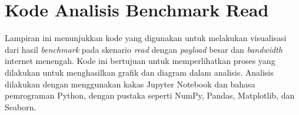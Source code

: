\chapter{Kode Analisis Benchmark Read}
\label{appendix:read-benchmark-code}

Lampiran ini menunjukkan kode yang digunakan untuk melakukan visualisasi dari hasil \textit{benchmark} pada skenario \textit{read} dengan \textit{payload} besar dan \textit{bandwidth} internet menengah. Kode ini bertujuan untuk memperlihatkan proses yang dilakukan untuk menghasilkan grafik dan diagram dalam analisis. Analisis dilakukan dengan menggunakan kakas Jupyter Notebook dan bahasa pemrograman Python, dengan pustaka seperti NumPy, Pandas, Matplotlib, dan Seaborn.

